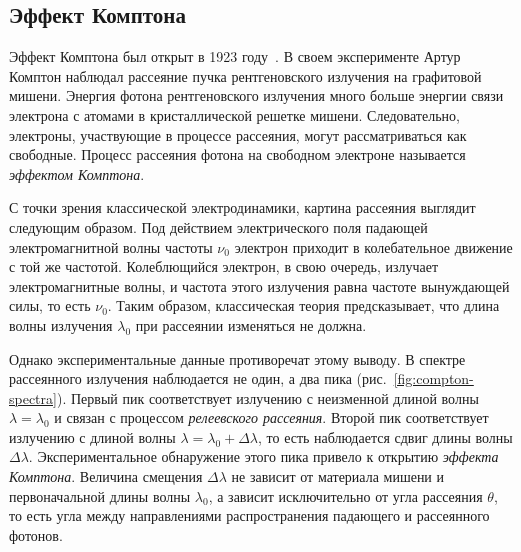 \documentclass[a4paper, 12pt]{article}
\begin{document}
\subsection{Эффект Комптона}

Эффект Комптона был открыт в 1923 году~\cite{Compton1923}.
В своем эксперименте Артур Комптон наблюдал рассеяние пучка рентгеновского
излучения на графитовой мишени.
Энергия фотона рентгеновского излучения много больше энергии связи электрона с
атомами в кристаллической решетке мишени. Следовательно, электроны, участвующие
в процессе рассеяния, могут рассматриваться как свободные. Процесс рассеяния
фотона на свободном электроне называется \emph{эффектом Комптона}.

С точки зрения классической электродинамики, картина рассеяния выглядит
следующим образом. Под действием электрического поля падающей электромагнитной
волны частоты $\nu_0$ электрон приходит в колебательное движение с той же частотой.
Колеблющийся электрон, в свою очередь, излучает электромагнитные волны, и
частота этого излучения равна частоте вынуждающей силы, то есть
$\nu_0$. Таким образом, классическая теория предсказывает, что длина волны
излучения $\lambda_0$ при рассеянии изменяться не должна.

Однако экспериментальные данные противоречат этому выводу. В спектре рассеянного
излучения наблюдается не один, а два пика (рис.~\ref{fig:compton-spectra}).
Первый пик соответствует излучению с неизменной длиной волны $\lambda = \lambda_0$
и связан с процессом \emph{релеевского рассеяния}.
Второй пик соответствует излучению с длиной волны $\lambda = \lambda_0 + \Delta\lambda$,
то есть наблюдается сдвиг длины волны $\Delta{\lambda}$. Экспериментальное
обнаружение этого пика привело к открытию \emph{эффекта Комптона}.
Величина смещения $\Delta{\lambda}$ не зависит от материала мишени и первоначальной
длины волны $\lambda_0$, а зависит исключительно от угла рассеяния $\theta$, то есть
угла между направлениями распространения падающего и рассеянного фотонов.
\end{document}
